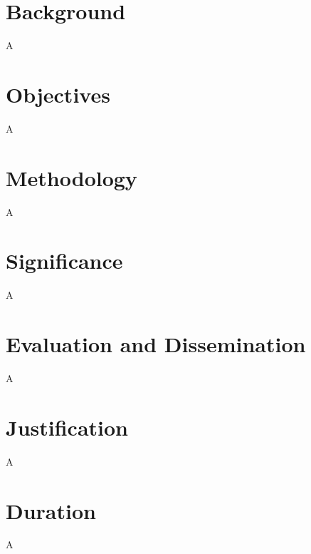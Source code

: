 \documentclass[12pt]{article}
\begin{document}
\section*{Background}
A
\section*{Objectives}
A

\section*{Methodology}
A
\section*{Significance}
A
\section*{Evaluation and Dissemination}
A
\section*{Justification}
A
\section*{Duration}
A
\end{document}
